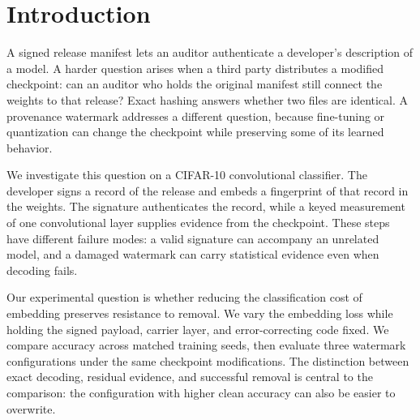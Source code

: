 \section{Introduction}
A signed release manifest lets an auditor authenticate a developer's description of a model. A harder question arises when a third party distributes a modified checkpoint: can an auditor who holds the original manifest still connect the weights to that release? Exact hashing answers whether two files are identical. A provenance watermark addresses a different question, because fine-tuning or quantization can change the checkpoint while preserving some of its learned behavior.

We investigate this question on a CIFAR-10 convolutional classifier. The developer signs a record of the release and embeds a fingerprint of that record in the weights. The signature authenticates the record, while a keyed measurement of one convolutional layer supplies evidence from the checkpoint. These steps have different failure modes: a valid signature can accompany an unrelated model, and a damaged watermark can carry statistical evidence even when decoding fails.

Our experimental question is whether reducing the classification cost of embedding preserves resistance to removal. We vary the embedding loss while holding the signed payload, carrier layer, and error-correcting code fixed. We compare accuracy across matched training seeds, then evaluate three watermark configurations under the same checkpoint modifications. The distinction between exact decoding, residual evidence, and successful removal is central to the comparison: the configuration with higher clean accuracy can also be easier to overwrite.
